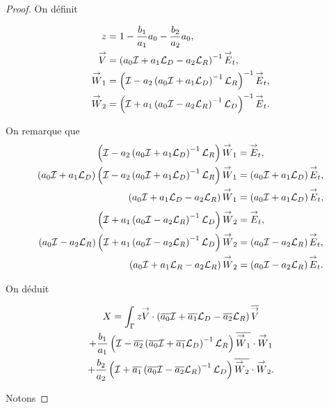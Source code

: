 \begin{proof}
    On définit

    \newcommand{\vV}{\vect{V}}
    \newcommand{\vW}{\vect{W}}

    \begin{align*}
      z &= 1-\frac{b_1}{a_1}a_0 -\frac{b_2}{a_2}a_0,
      \\
      \vV & = \left(a_0\oI  + a_1 \LD - a_2\LR \right)^{-1} \vE_t,
      \\
      \vW_1 & = \left( \oI - a_2 \left( a_0\oI + a_1\LD\right)^{-1}\LR\right)^{-1} \vE_t,
      \\
      \vW_2 & = \left( \oI + a_1 \left( a_0\oI - a_2\LR\right)^{-1}\LD\right)^{-1} \vE_t.
    \end{align*}

    On remarque que
    \begin{align*}
      \left( \oI - a_2 \left( a_0\oI + a_1\LD\right)^{-1}\LR\right)\vW_1 &= \vE_t,
      \\
      \left( a_0\oI + a_1 \LD \right)\left( \oI - a_2 \left( a_0\oI + a_1\LD\right)^{-1}\LR\right)\vW_1&= \left( a_0\oI + a_1 \LD \right)\vE_t,
      \\
      \left( a_0\oI + a_1 \LD - a_2 \LR\right)\vW_1 &= \left( a_0\oI + a_1 \LD \right)\vE_t,
    \end{align*}
    \begin{align*}
      \left( \oI + a_1 \left( a_0\oI - a_2\LR\right)^{-1}\LD\right)\vW_2 &= \vE_t,
      \\
      \left( a_0\oI - a_2 \LR \right)\left( \oI + a_1 \left( a_0\oI - a_2\LR\right)^{-1}\LD\right)\vW_2&= \left( a_0\oI - a_2 \LR \right)\vE_t,
      \\
      \left( a_0\oI + a_1 \LR - a_2 \LR\right)\vW_2 &= \left( a_0\oI - a_2 \LR \right)\vE_t.
    \end{align*}

    On déduit

    \begin{multline*}
      X = \int_\Gamma z \vV \cdot \left(\conj{a_0}\oI  + \conj{a_1} \LD - \conj{a_2}\LR\right)\conj{\vV}
      \\
      + \frac{b_1}{a_1} \left( \oI - \conj{a_2} \left( \conj{a_0}\oI + \conj{a_1}\LD\right)^{-1}\LR\right)\conj{\vW_1}\cdot\vW_1
      \\
      + \frac{b_2}{a_2} \left( \oI + \conj{a_1} \left( \conj{a_0}\oI - \conj{a_2}\LR\right)^{-1}\LD\right)\conj{\vW_2}\cdot\vW_2.
    \end{multline*}

    Notons


\end{proof}
